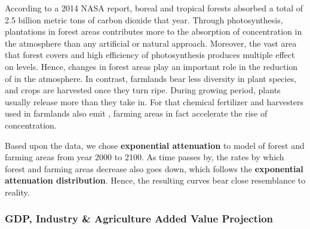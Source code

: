 \documentclass[12pt]{article}
\begin{document}
According to a 2014 NASA report, boreal and tropical forests absorbed a total of 2.5 billion metric tons of carbon dioxide that year. Through photosynthesis, plantations in forest areas contributes more to the absorption of  concentration in the atmosphere than any artificial or natural approach. Moreover, the vast area that forest covers and high efficiency of photosynthesis produces multiple effect on  levels. Hence, changes in forest areas play an important role in the reduction of  in the atmosphere. In contrast, farmlands bear less diversity in plant species, and crops are harvested once they turn ripe. During growing period, plants usually release more  than they take in. For that chemical fertilizer and harvesters used in farmlands also emit , farming areas in fact accelerate the rise of  concentration.

Based upon the data, we chose \textbf{exponential attenuation} to model of forest and farming areas from year 2000 to 2100. As time passes by, the rates by which forest and farming areas decrease also goes down, which follows the \textbf{exponential attenuation distribution}. Hence, the resulting curves bear close resemblance to reality.


\subsubsection*{GDP, Industry \& Agriculture Added Value Projection}
\end{document}
